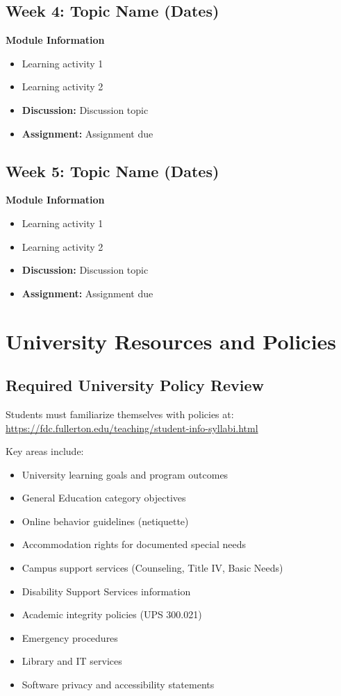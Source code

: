 \documentclass[11pt]{scrartcl} %
\begin{document}
\subsection{Week 4: Topic Name (Dates)}
\textbf{Module Information}
\begin{itemize}
\item Learning activity 1
\item Learning activity 2
\item \textbf{Discussion:} Discussion topic
\item \textbf{Assignment:} Assignment due
\end{itemize}

\subsection{Week 5: Topic Name (Dates)}
\textbf{Module Information}
\begin{itemize}
\item Learning activity 1
\item Learning activity 2
\item \textbf{Discussion:} Discussion topic
\item \textbf{Assignment:} Assignment due
\end{itemize}


\section{University Resources and Policies}

\subsection{Required University Policy Review}
Students must familiarize themselves with policies at: \\
\url{https://fdc.fullerton.edu/teaching/student-info-syllabi.html}

Key areas include:
\begin{itemize}
\item University learning goals and program outcomes
\item General Education category objectives
\item Online behavior guidelines (netiquette)
\item Accommodation rights for documented special needs
\item Campus support services (Counseling, Title IV, Basic Needs)
\item Disability Support Services information
\item Academic integrity policies (UPS 300.021)
\item Emergency procedures
\item Library and IT services
\item Software privacy and accessibility statements
\end{itemize}
\end{document}
